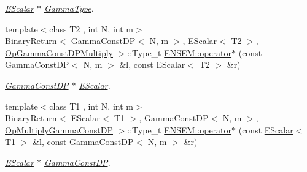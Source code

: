 \begin{DoxyCompactItemize}
\begin{DoxyCompactList}\small\item\em \mbox{\hyperlink{classENSEM_1_1EScalar}{E\+Scalar}} $\ast$ \mbox{\hyperlink{classENSEM_1_1GammaType}{Gamma\+Type}}. \end{DoxyCompactList}\item 
{\footnotesize template$<$class T2 , int N, int m$>$ }\\\mbox{\hyperlink{structENSEM_1_1BinaryReturn}{Binary\+Return}}$<$ \mbox{\hyperlink{classENSEM_1_1GammaConstDP}{Gamma\+Const\+DP}}$<$ \mbox{\hyperlink{operator__name__util_8cc_a7722c8ecbb62d99aee7ce68b1752f337}{N}}, m $>$, \mbox{\hyperlink{classENSEM_1_1EScalar}{E\+Scalar}}$<$ T2 $>$, \mbox{\hyperlink{structENSEM_1_1OpGammaConstDPMultiply}{Op\+Gamma\+Const\+D\+P\+Multiply}} $>$\+::Type\+\_\+t \mbox{\hyperlink{group__escalar_ga37b9d878f5157952ec965d47a1032bc0}{E\+N\+S\+E\+M\+::operator$\ast$}} (const \mbox{\hyperlink{classENSEM_1_1GammaConstDP}{Gamma\+Const\+DP}}$<$ \mbox{\hyperlink{operator__name__util_8cc_a7722c8ecbb62d99aee7ce68b1752f337}{N}}, m $>$ \&l, const \mbox{\hyperlink{classENSEM_1_1EScalar}{E\+Scalar}}$<$ T2 $>$ \&r)
\begin{DoxyCompactList}\small\item\em \mbox{\hyperlink{classENSEM_1_1GammaConstDP}{Gamma\+Const\+DP}} $\ast$ \mbox{\hyperlink{classENSEM_1_1EScalar}{E\+Scalar}}. \end{DoxyCompactList}\item 
{\footnotesize template$<$class T1 , int N, int m$>$ }\\\mbox{\hyperlink{structENSEM_1_1BinaryReturn}{Binary\+Return}}$<$ \mbox{\hyperlink{classENSEM_1_1EScalar}{E\+Scalar}}$<$ T1 $>$, \mbox{\hyperlink{classENSEM_1_1GammaConstDP}{Gamma\+Const\+DP}}$<$ \mbox{\hyperlink{operator__name__util_8cc_a7722c8ecbb62d99aee7ce68b1752f337}{N}}, m $>$, \mbox{\hyperlink{structENSEM_1_1OpMultiplyGammaConstDP}{Op\+Multiply\+Gamma\+Const\+DP}} $>$\+::Type\+\_\+t \mbox{\hyperlink{group__escalar_gaa60096d471282c83dab865d42b53ce96}{E\+N\+S\+E\+M\+::operator$\ast$}} (const \mbox{\hyperlink{classENSEM_1_1EScalar}{E\+Scalar}}$<$ T1 $>$ \&l, const \mbox{\hyperlink{classENSEM_1_1GammaConstDP}{Gamma\+Const\+DP}}$<$ \mbox{\hyperlink{operator__name__util_8cc_a7722c8ecbb62d99aee7ce68b1752f337}{N}}, m $>$ \&r)
\begin{DoxyCompactList}\small\item\em \mbox{\hyperlink{classENSEM_1_1EScalar}{E\+Scalar}} $\ast$ \mbox{\hyperlink{classENSEM_1_1GammaConstDP}{Gamma\+Const\+DP}}. \end{DoxyCompactList}\item 

\end{DoxyCompactItemize}
